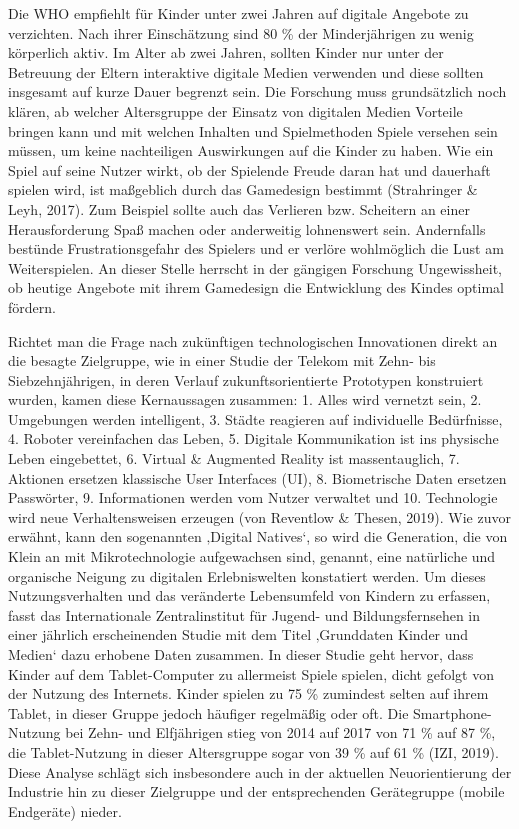 \documentclass[
  a4paper,
  DIV=11,
  numbers=noendperiod,
  onecolumn,
  oneside,
  a4paper]{scrartcl}
\begin{document}
Die WHO empfiehlt für Kinder unter zwei Jahren auf digitale Angebote zu
verzichten. Nach ihrer Einschätzung sind 80 \% der Minderjährigen zu
wenig körperlich aktiv. Im Alter ab zwei Jahren, sollten Kinder nur
unter der Betreuung der Eltern interaktive digitale Medien verwenden und
diese sollten insgesamt auf kurze Dauer begrenzt sein. Die Forschung
muss grundsätzlich noch klären, ab welcher Altersgruppe der Einsatz von
digitalen Medien Vorteile bringen kann und mit welchen Inhalten und
Spielmethoden Spiele versehen sein müssen, um keine nachteiligen
Auswirkungen auf die Kinder zu haben. Wie ein Spiel auf seine Nutzer
wirkt, ob der Spielende Freude daran hat und dauerhaft spielen wird, ist
maßgeblich durch das Gamedesign bestimmt (Strahringer \& Leyh, 2017).
Zum Beispiel sollte auch das Verlieren bzw. Scheitern an einer
Herausforderung Spaß machen oder anderweitig lohnenswert sein.
Andernfalls bestünde Frustrationsgefahr des Spielers und er verlöre
wohlmöglich die Lust am Weiterspielen. An dieser Stelle herrscht in der
gängigen Forschung Ungewissheit, ob heutige Angebote mit ihrem
Gamedesign die Entwicklung des Kindes optimal fördern.

Richtet man die Frage nach zukünftigen technologischen Innovationen
direkt an die besagte Zielgruppe, wie in einer Studie der Telekom mit
Zehn- bis Siebzehnjährigen, in deren Verlauf zukunftsorientierte
Prototypen konstruiert wurden, kamen diese Kernaussagen zusammen: 1.
Alles wird vernetzt sein, 2. Umgebungen werden intelligent, 3. Städte
reagieren auf individuelle Bedürfnisse, 4. Roboter vereinfachen das
Leben, 5. Digitale Kommunikation ist ins physische Leben eingebettet, 6.
Virtual \& Augmented Reality ist massentauglich, 7. Aktionen ersetzen
klassische User Interfaces (UI), 8. Biometrische Daten ersetzen
Passwörter, 9. Informationen werden vom Nutzer verwaltet und 10.
Technologie wird neue Verhaltensweisen erzeugen (von Reventlow \&
Thesen, 2019). Wie zuvor erwähnt, kann den sogenannten ‚Digital
Natives`, so wird die Generation, die von Klein an mit Mikrotechnologie
aufgewachsen sind, genannt, eine natürliche und organische Neigung zu
digitalen Erlebniswelten konstatiert werden. Um dieses Nutzungsverhalten
und das veränderte Lebensumfeld von Kindern zu erfassen, fasst das
Internationale Zentralinstitut für Jugend- und Bildungsfernsehen in
einer jährlich erscheinenden Studie mit dem Titel ‚Grunddaten Kinder und
Medien` dazu erhobene Daten zusammen. In dieser Studie geht hervor, dass
Kinder auf dem Tablet-Computer zu allermeist Spiele spielen, dicht
gefolgt von der Nutzung des Internets. Kinder spielen zu 75 \% zumindest
selten auf ihrem Tablet, in dieser Gruppe jedoch häufiger regelmäßig
oder oft. Die Smartphone-Nutzung bei Zehn- und Elfjährigen stieg von
2014 auf 2017 von 71 \% auf 87 \%, die Tablet-Nutzung in dieser
Altersgruppe sogar von 39 \% auf 61 \% (IZI, 2019). Diese Analyse
schlägt sich insbesondere auch in der aktuellen Neuorientierung der
Industrie hin zu dieser Zielgruppe und der entsprechenden Gerätegruppe
(mobile Endgeräte) nieder.
\end{document}
